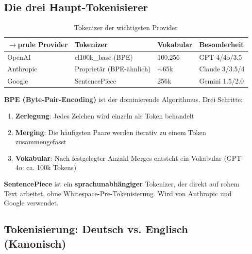 
\subsection{Die drei Haupt-Tokenisierer}
\label{sec:three_tokenizers}

\begin{table}[H]
\centering
\begin{tabularx}{\linewidth}{lXXX}
$\to$prule
\textbf{Provider} & \textbf{Tokenizer} & \textbf{Vokabular} & \textbf{Besonderheit} \\
\midrule
OpenAI & cl100k\_base (BPE) & 100.256 & GPT-4/4o/3.5 \\
Anthropic & Proprietär (BPE-ähnlich) & $\sim$65k & Claude 3/3.5/4 \\
Google & SentencePiece & 256k & Gemini 1.5/2.0 \\
\bottomrule
\end{tabularx}
\caption{Tokenizer der wichtigsten Provider}
\label{tab:tokenizer_comparison}
\end{table}

\textbf{BPE (Byte-Pair-Encoding)} ist der dominierende Algorithmus. Drei Schritte:
\begin{enumerate}[leftmargin=*]
  \item \textbf{Zerlegung}: Jedes Zeichen wird einzeln als Token behandelt
  \item \textbf{Merging}: Die häufigsten Paare werden iterativ zu einem Token zusammengefasst
  \item \textbf{Vokabular}: Nach festgelegter Anzahl Merges entsteht ein Vokabular (GPT-4o: ca. 100k Tokens)
\end{enumerate}

\textbf{SentencePiece} ist ein \textbf{sprachunabhängiger} Tokenizer, der direkt auf rohem Text arbeitet, ohne Whitespace-Pre-Tokenisierung. Wird von Anthropic und Google verwendet.

\subsection{Tokenisierung: Deutsch vs. Englisch (Kanonisch)}
\label{sec:de_vs_en_tokenization}


